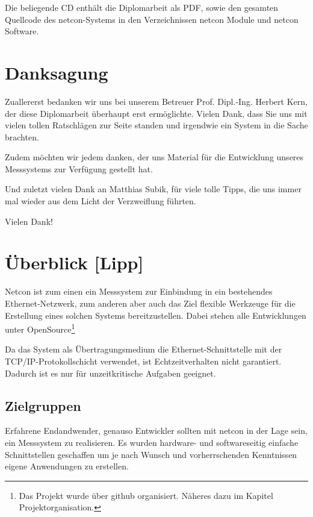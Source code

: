 \documentclass[a4paper,14pt,headsepline]{scrartcl}
\begin{document}
Die beliegende CD enthält die Diplomarbeit als PDF, sowie den gesamten Quellcode des netcon-Systems in den Verzeichnissen netcon Module und netcon Software. 

\newpage

\section*{Danksagung}
Zuallererst bedanken wir uns bei unserem Betreuer Prof. Dipl.-Ing. Herbert Kern, der diese Diplomarbeit überhaupt erst ermöglichte. Vielen Dank, dass Sie uns mit vielen tollen Ratschlägen zur Seite standen und irgendwie ein System in die Sache brachten.

Zudem möchten wir jedem danken, der uns Material für die Entwicklung unseres Messsystems zur Verfügung gestellt hat.

Und zuletzt vielen Dank an Matthias Subik, für viele tolle Tipps, die uns immer mal wieder aus dem Licht der Verzweiflung führten.

Vielen Dank! 


\newpage


\newpage

\tableofcontents
\newpage


\section{Überblick [Lipp]}

Netcon ist zum einen ein Messsystem zur Einbindung in ein bestehendes Ethernet-Netzwerk, zum anderen aber auch das Ziel flexible Werkzeuge für die Erstellung eines solchen Systems bereitzustellen. Dabei stehen alle Entwicklungen unter OpenSource\footnote{Das Projekt wurde über github organisiert. Näheres dazu im Kapitel Projektorganisation.} 

Da das System als Übertragungsmedium die Ethernet-Schnittstelle mit der TCP/IP-Protokollschicht verwendet, ist Echtzeitverhalten nicht garantiert. Dadurch ist es nur für unzeitkritische Aufgaben geeignet. 

\subsection{Zielgruppen}
Erfahrene Endandwender, genauso Entwickler sollten mit netcon in der Lage sein, ein Messsystem zu realisieren. Es wurden hardware- und softwareseitig einfache Schnittstellen geschaffen um je nach Wunsch und vorherrschenden Kenntnissen eigene Anwendungen zu erstellen. 
\end{document}
